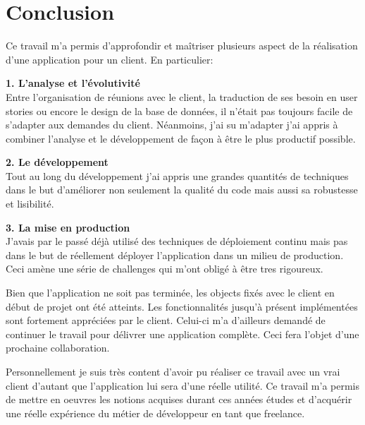 \section{Conclusion}

Ce travail m'a permis d'approfondir et maîtriser plusieurs aspect de la réalisation d'une application pour un client. En particulier:

\vskip 0.5cm

\textbf{1. L'analyse et l'évolutivité} \\Entre l'organisation de réunions avec le client, la traduction de ses besoin en user stories ou encore le design de la base de données, il n'était pas toujours facile de s'adapter aux demandes du client. Néanmoins, j'ai su m'adapter j'ai appris à combiner l'analyse et le développement de façon à être le plus productif possible. 

\vskip 0.5cm
\textbf{2. Le développement} \\Tout au long du développement j'ai appris une grandes quantités de techniques dans le but d'améliorer non seulement la qualité du code mais aussi sa robustesse et lisibilité. 

\vskip 0.5cm
\textbf{3. La mise en production} \\J'avais par le passé déjà utilisé des techniques de déploiement continu mais pas dans le but de réellement déployer l'application dans un milieu de production. Ceci amène une série de challenges qui m'ont obligé à être tres rigoureux. 

\newpara

Bien que l'application ne soit pas terminée, les objects fixés avec le client en début de projet ont été atteints. Les fonctionnalités jusqu'à présent implémentées sont fortement appréciées par le client. Celui-ci m'a d'ailleurs demandé de continuer le travail pour délivrer une application complète. Ceci fera l'objet d'une prochaine collaboration. 

\newpara

Personnellement je suis très content d'avoir pu réaliser ce travail avec un vrai client d'autant que l'application lui sera d'une réelle utilité. Ce travail m'a permis de mettre en oeuvres les notions acquises durant ces années études et d'acquérir une réelle expérience du métier de développeur en tant que freelance. 